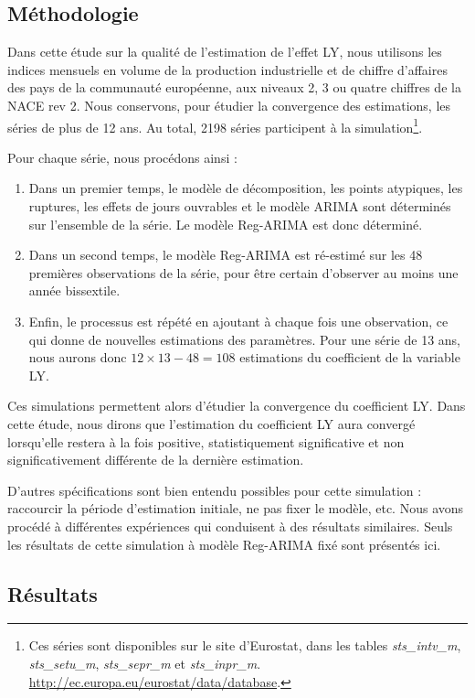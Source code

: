 \documentclass[12pt, a4paper, french]{article}
\begin{document}
\subsection{Méthodologie}

Dans cette étude sur la qualité de l'estimation de l'effet LY, nous utilisons les indices mensuels en volume de la production industrielle et de chiffre d'affaires des pays de la communauté européenne, aux niveaux 2, 3 ou quatre chiffres de la NACE rev 2. Nous conservons, pour étudier la convergence des estimations, les séries de plus de 12 ans. Au total, 2198 séries participent à la simulation\footnote{Ces séries sont disponibles sur le site d'Eurostat, dans les tables \emph{sts\_intv\_m}, \emph{sts\_setu\_m}, \emph{sts\_sepr\_m} et \emph{sts\_inpr\_m}. \url{http://ec.europa.eu/eurostat/data/database}.}.

Pour chaque série, nous procédons ainsi :
\begin{enumerate}
	\item Dans un premier temps, le modèle de décomposition, les points atypiques, les ruptures, les effets de jours ouvrables et le modèle ARIMA sont déterminés sur l'ensemble de la série. Le modèle Reg-ARIMA est donc déterminé.
	\item Dans un second temps, le modèle Reg-ARIMA est ré-estimé sur les 48 premières observations de la série, pour être certain d'observer au moins une année bissextile.
	\item Enfin, le processus est répété en ajoutant à chaque fois une observation, ce qui donne de nouvelles estimations des paramètres. Pour une série de 13 ans, nous aurons donc $12\times13 - 48 = 108$ estimations du coefficient de la variable LY.
\end{enumerate}
Ces simulations permettent alors d'étudier la convergence du coefficient LY. Dans cette étude, nous dirons que l'estimation du coefficient LY aura convergé lorsqu'elle restera à la fois positive, statistiquement significative et non significativement différente de la dernière estimation.

D'autres spécifications sont bien entendu possibles pour cette simulation : raccourcir la période d'estimation initiale, ne pas fixer le modèle, etc. Nous avons procédé à différentes expériences qui conduisent à des résultats similaires. Seuls les résultats de cette simulation à modèle Reg-ARIMA fixé sont présentés ici.

\subsection{Résultats}
\end{document}
